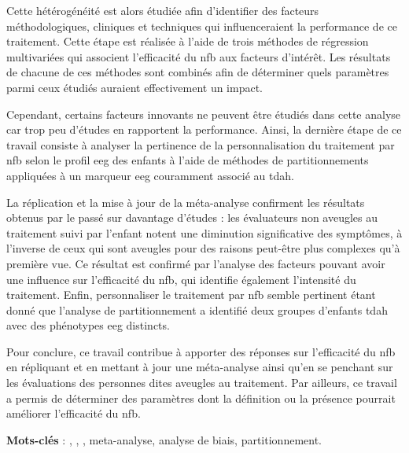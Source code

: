 Cette hétérogénéité est alors étudiée afin d'identifier des facteurs méthodologiques, cliniques et techniques qui influenceraient 
la performance de ce traitement. Cette étape 
est réalisée à l'aide de trois méthodes de régression multivariées qui associent l'efficacité du \gls{nfb} aux facteurs d'intérêt. 
Les résultats de chacune de ces méthodes sont combinés afin de déterminer quels paramètres parmi ceux étudiés auraient effectivement un impact. 

Cependant, certains facteurs innovants ne peuvent être étudiés dans cette analyse car trop peu d'études en rapportent la performance. 
Ainsi, la dernière étape de ce travail consiste à analyser la pertinence de la personnalisation du traitement par \gls{nfb} selon le profil 
\gls{eeg} des enfants à l'aide de méthodes de partitionnements appliquées à un marqueur \gls{eeg} couramment associé au \gls{tdah}. 

La réplication et la mise à jour de la méta-analyse confirment les résultats obtenus par le passé sur davantage d'études : 
les évaluateurs non aveugles au traitement suivi par l'enfant notent une diminution significative des symptômes, à l'inverse 
de ceux qui sont aveugles pour des raisons peut-être plus complexes qu'à première vue. Ce résultat est confirmé par l'analyse 
des facteurs pouvant avoir une influence sur l'efficacité du \gls{nfb}, qui identifie également l'intensité du traitement. Enfin, 
personnaliser le traitement par \gls{nfb} semble pertinent étant donné que l'analyse de partitionnement a identifié deux groupes d'enfants 
\gls{tdah} avec des phénotypes \gls{eeg} distincts.

Pour conclure, ce travail contribue à apporter des réponses sur l'efficacité du \gls{nfb} en répliquant et en mettant à jour une méta-analyse ainsi qu'en se penchant sur 
les évaluations des personnes dites aveugles au traitement. Par ailleurs, ce travail a permis de déterminer des paramètres dont la définition ou la présence 
pourrait améliorer l'efficacité du \gls{nfb}.

\large{\textbf{Mots-clés}} : , , , meta-analyse, analyse de biais, partitionnement.